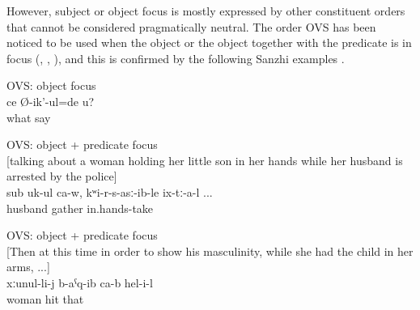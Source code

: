 However, subject or object focus is mostly expressed by other constituent orders that cannot be considered pragmatically neutral. The order OVS has been noticed to be used when the object or the object together with the predicate is in focus (\citealt{Testelec1998a}, \citeyearpar{Testelets.1998c}, \citealt{Forker.Belyaev2016}), and this is confirmed by the following Sanzhi examples .
%
\begin{exe}
	\ex	OVS: object focus \\\label{ex:What do you (masc.) say1}
	\gll	ce	Ø-ik'-ul=de	u?\\
		what	say	\\
	\glt	{}
	
	\ex	OVS: object + predicate focus\\\label{ex:they are taking her husband, took him away OVS}%
		[talking about a woman holding her little son in her hands while her husband is arrested by the police]\\
	\gll	sub	uk-ul	ca-w,	kʷi-r-s-asː-ib-le	ix-tː-a-l ...\\
		husband	gather		in.hands-take	\\
	\glt	{}

	\ex	OVS: object + predicate focus\\\label{ex:‎‎Then at this time in order to show his masculinity, while she had the child in her arms, he hit his wife OVS}
	[‎‎Then at this time in order to show his masculinity, while she had the child in her arms, ...]\\
	\gll	xːunul-li-j	b-aˁq-ib	ca-b	hel-i-l\\
		woman	hit		that\\
	\glt	{}
\end{exe}

